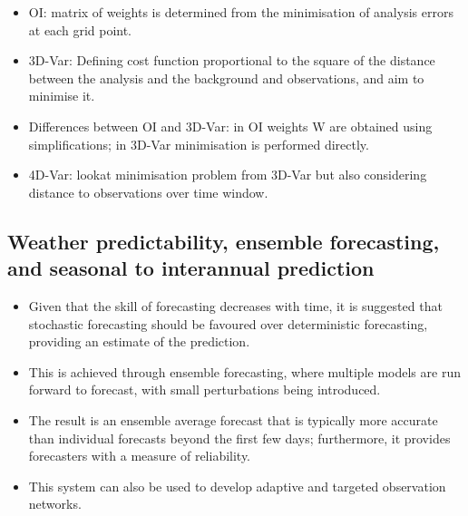 \begin{itemize}
\begin{itemize}
        \item OI: matrix of weights is determined from the minimisation of analysis errors at each grid point.
        \item 3D-Var: Defining cost function proportional to the square of the distance between the analysis and the background and observations, and aim to minimise it.
        \item Differences between OI and 3D-Var: in OI weights W are obtained using simplifications; in 3D-Var minimisation is performed directly.
        \item 4D-Var: lookat minimisation problem from 3D-Var but also considering distance to observations over time window.
    \end{itemize}
\end{itemize}

\subsection{Weather predictability, ensemble forecasting, and seasonal to interannual prediction}
\label{subs:historical_overview:predictability}

\begin{itemize}
    \item Given that the skill of forecasting decreases with time, it is suggested that stochastic forecasting should be favoured over deterministic forecasting, providing an estimate of the prediction.
    \item This is achieved through ensemble forecasting, where multiple models are run forward to forecast, with small perturbations being introduced.
    \item The result is an ensemble average forecast that is typically more accurate than individual forecasts beyond the first few days; furthermore, it provides forecasters with a measure of reliability.
    \item This system can also be used to develop adaptive and targeted observation networks.
\end{itemize}



